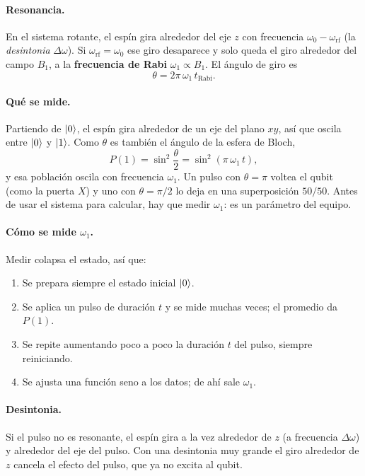 \paragraph{Resonancia.} En el sistema rotante, el espín gira alrededor del eje
$z$ con frecuencia $\omega_0-\omega_{\mathrm{rf}}$ (la \emph{desintonia}
$\Delta\omega$). Si $\omega_{\mathrm{rf}}=\omega_0$ ese giro desaparece y solo
queda el giro alrededor del campo $B_1$, a la \textbf{frecuencia de Rabi}
$\omega_1\propto B_1$. El ángulo de giro es
\begin{equation}
  \theta=2\pi\,\omega_1\,t_{\mathrm{Rabi}} .
\end{equation}

\paragraph{Qué se mide.} Partiendo de $\left|0\right\rangle$, el espín gira alrededor de un
eje del plano $xy$, así que oscila entre $\left|0\right\rangle$ y $\left|1\right\rangle$. Como $\theta$ es
también el ángulo de la esfera de Bloch,
\begin{equation}
  P(1)=\sin^2\frac\theta2=\sin^2(\pi\,\omega_1\,t),
\end{equation}
y esa población oscila con frecuencia $\omega_1$. Un pulso con $\theta=\pi$ voltea
el qubit (como la puerta $X$) y uno con $\theta=\pi/2$ lo deja en una
superposición $50/50$. Antes de usar el sistema para calcular, hay que medir
$\omega_1$: es un parámetro del equipo.

\paragraph{Cómo se mide $\omega_1$.} Medir colapsa el estado, así que:
\begin{enumerate}
  \item Se prepara siempre el estado inicial $\left|0\right\rangle$.
  \item Se aplica un pulso de duración $t$ y se mide muchas veces; el
    promedio da $P(1)$.
  \item Se repite aumentando poco a poco la duración $t$ del pulso, siempre
    reiniciando.
  \item Se ajusta una función seno a los datos; de ahí sale $\omega_1$.
\end{enumerate}

\paragraph{Desintonia.} Si el pulso no es resonante, el espín gira a la vez
alrededor de $z$ (a frecuencia $\Delta\omega$) y alrededor del eje del pulso.
Con una desintonia muy grande el giro alrededor de $z$ cancela el efecto del
pulso, que ya no excita al qubit.

